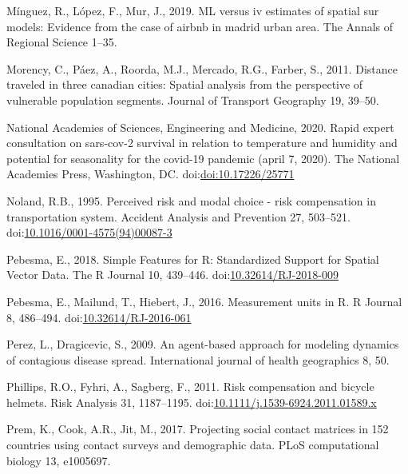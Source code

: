 \documentclass[]{elsarticle} %
\begin{document}
\leavevmode\hypertarget{ref-Minguez2019}{}%
Mínguez, R., López, F., Mur, J., 2019. ML versus iv estimates of spatial
sur models: Evidence from the case of airbnb in madrid urban area. The
Annals of Regional Science 1--35.

\leavevmode\hypertarget{ref-Morency2011distance}{}%
Morency, C., Páez, A., Roorda, M.J., Mercado, R.G., Farber, S., 2011.
Distance traveled in three canadian cities: Spatial analysis from the
perspective of vulnerable population segments. Journal of Transport
Geography 19, 39--50.

\leavevmode\hypertarget{ref-National2020rapid}{}%
National Academies of Sciences, Engineering and Medicine, 2020. Rapid
expert consultation on sars-cov-2 survival in relation to temperature
and humidity and potential for seasonality for the covid-19 pandemic
(april 7, 2020). The National Academies Press, Washington, DC.
doi:\href{https://doi.org/doi:10.17226/25771}{doi:10.17226/25771}

\leavevmode\hypertarget{ref-Noland1995perceived}{}%
Noland, R.B., 1995. Perceived risk and modal choice - risk compensation
in transportation system. Accident Analysis and Prevention 27, 503--521.
doi:\href{https://doi.org/10.1016/0001-4575(94)00087-3}{10.1016/0001-4575(94)00087-3}

\leavevmode\hypertarget{ref-Pebesma2018}{}%
Pebesma, E., 2018. Simple Features for R: Standardized Support for
Spatial Vector Data. The R Journal 10, 439--446.
doi:\href{https://doi.org/10.32614/RJ-2018-009}{10.32614/RJ-2018-009}

\leavevmode\hypertarget{ref-Pebesma2016}{}%
Pebesma, E., Mailund, T., Hiebert, J., 2016. Measurement units in R. R
Journal 8, 486--494.
doi:\href{https://doi.org/10.32614/RJ-2016-061}{10.32614/RJ-2016-061}

\leavevmode\hypertarget{ref-Perez2009agent}{}%
Perez, L., Dragicevic, S., 2009. An agent-based approach for modeling
dynamics of contagious disease spread. International journal of health
geographics 8, 50.

\leavevmode\hypertarget{ref-Phillips2011risk}{}%
Phillips, R.O., Fyhri, A., Sagberg, F., 2011. Risk compensation and
bicycle helmets. Risk Analysis 31, 1187--1195.
doi:\href{https://doi.org/10.1111/j.1539-6924.2011.01589.x}{10.1111/j.1539-6924.2011.01589.x}

\leavevmode\hypertarget{ref-Prem2017projecting}{}%
Prem, K., Cook, A.R., Jit, M., 2017. Projecting social contact matrices
in 152 countries using contact surveys and demographic data. PLoS
computational biology 13, e1005697.
\end{document}
